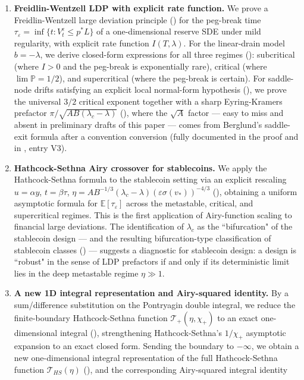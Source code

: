 \documentclass[11pt,a4paper]{article}
\theoremstyle{plain}
\theoremstyle{definition}
\newcommand{\E}{\mathbb{E}}
\renewcommand{\P}{\mathbb{P}}
\begin{document}
\begin{enumerate}
\item \textbf{Freidlin-Wentzell LDP with explicit rate function.}
    We prove a Freidlin-Wentzell large deviation principle () for the peg-break time $\tau_\varepsilon = \inf\{t : V_t^\varepsilon \leq p^*L\}$ of a one-dimensional reserve SDE under mild regularity, with explicit rate function $I(T,\lambda)$. For the linear-drain model $b = -\lambda$, we derive closed-form expressions for all three regimes (): subcritical (where $I > 0$ and the peg-break is exponentially rare), critical (where $\lim \P = 1/2$), and supercritical (where the peg-break is certain).
    For saddle-node drifts satisfying an explicit local normal-form hypothesis (), we prove the universal $3/2$ critical exponent together with a sharp Eyring-Kramers prefactor $\pi/\sqrt{AB(\lambda_c-\lambda)}$ (), where the $\sqrt A$ factor --- easy to miss and absent in preliminary drafts of this paper --- comes from Berglund's saddle-exit formula after a convention conversion (fully documented in the proof and in , entry V3).
\item \textbf{Hathcock-Sethna Airy crossover for stablecoins.}
    We apply the Hathcock-Sethna formula to the stablecoin setting via an explicit rescaling $u = \alpha y$, $t = \beta\tau$, $\eta = AB^{-1/3}(\lambda_c-\lambda)(\varepsilon\sigma(v_*))^{-4/3}$ (), obtaining a uniform asymptotic formula for $\E[\tau_\varepsilon]$ across the metastable, critical, and supercritical regimes.
    This is the first application of Airy-function scaling to financial large deviations.
    The identification of $\lambda_c$ as the ``bifurcation" of the stablecoin design --- and the resulting bifurcation-type classification of stablecoin classes () --- suggests a diagnostic for stablecoin design: a design is ``robust" in the sense of LDP prefactors if and only if its deterministic limit lies in the deep metastable regime $\eta \gg 1$.
\item \textbf{A new 1D integral representation and Airy-squared identity.}
    By a sum/difference substitution on the Pontryagin double integral, we reduce the finite-boundary Hathcock-Sethna function $\mathcal T_+(\eta,\chi_+)$ to an exact one-dimensional integral (), strengthening Hathcock-Sethna's $1/\chi_+$ asymptotic expansion to an exact closed form.
    Sending the boundary to $-\infty$, we obtain a new one-dimensional integral representation of the full Hathcock-Sethna function $\mathcal T_{HS}(\eta)$ (), and the corresponding Airy-squared integral identity

\end{enumerate}
\end{document}
